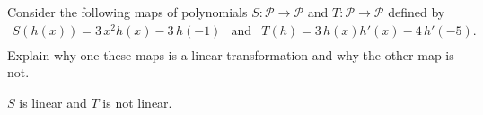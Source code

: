 
\begin{exerciseStatement}


Consider the following maps of polynomials \(S:\mathcal{P}\rightarrow\mathcal{P}\) and \(T:\mathcal{P}\rightarrow\mathcal{P}\) defined by 
\begin{align*} S(h(x))= 3 \, x^{2} h\left(x\right) - 3 \, h\left(-1\right)  & \text{and} & T(h)= 3 \, h\left(x\right) h'\left(x\right) - 4 \, h'\left(-5\right) . \\ \end{align*}
             Explain why one these maps is a linear transformation and why the other map is not. 


\end{exerciseStatement}
    
\begin{exerciseAnswer} 


\(S\) is linear and \(T\) is not linear.


\end{exerciseAnswer}
    
